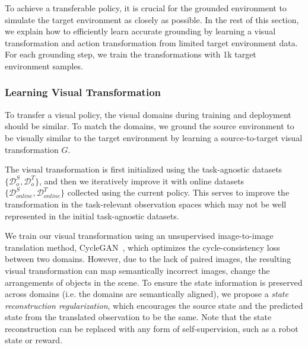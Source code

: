 To achieve a transferable policy, it is crucial for the grounded environment to simulate the target environment as closely as possible. In the rest of this section, we explain how to efficiently learn accurate grounding by learning a visual transformation and action transformation from limited target environment data.  For each grounding step, we train the transformations with 1k target environment samples.


\subsubsection{\textbf{Learning Visual Transformation}} 
\label{sec:visual_transformation}

To transfer a visual policy, the visual domains during training and deployment should be similar. To match the domains, we ground the source environment to be visually similar to the target environment by learning a source-to-target visual transformation $G$. 

The visual transformation is first initialized using the task-agnostic datasets $\{\mathcal{D}_o^S, \mathcal{D}_o^T\}$, and then we iteratively improve it with online datasets $\{\mathcal{D}^S_{online}, \mathcal{D}^T_{online}\}$ collected using the current policy.  This serves to improve the transformation in the task-relevant observation spaces which may not be well represented in the initial task-agnostic datasets.

We train our visual transformation using an unsupervised image-to-image translation method, CycleGAN~\citep{zhu2017unpaired}, which optimizes the cycle-consistency loss between two domains. However, due to the lack of paired images, the resulting visual transformation can map semantically incorrect images, \eg change the arrangements of objects in the scene.
To ensure the state information is preserved across domains (i.e. the domains are semantically aligned), we propose a \textit{state reconstruction regularization}, which encourages the source state and the predicted state from the translated observation to be the same. Note that the state reconstruction can be replaced with any form of self-supervision, such as a robot state or reward.

